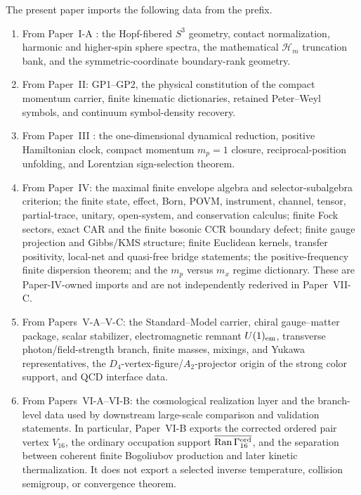 \documentclass[12pt,a4paper]{article}
\begin{document}
The present paper imports the following data from the prefix.
\begin{enumerate}[label=(I\arabic*), leftmargin=2.8em]

\item From Paper~I-A \cite{Kugelmann2026a}: the Hopf-fibered \(S^3\) geometry, contact normalization,
harmonic and higher-spin sphere spectra, the mathematical \(\mathcal H_m\) truncation bank, and the symmetric-coordinate boundary-rank geometry.

\item From Paper~II: GP1--GP2, the physical constitution of the compact momentum carrier, finite kinematic dictionaries, retained Peter--Weyl symbols, and
continuum symbol-density recovery.

\item From Paper~III \cite{Kugelmann2026c}: the one-dimensional dynamical reduction, positive
Hamiltonian clock, compact momentum \(m_p=1\) closure, reciprocal-position
unfolding, and Lorentzian sign-selection theorem.

\item From Paper~IV: the maximal finite envelope algebra and selector-subalgebra
criterion; the finite state, effect, Born, POVM, instrument, channel, tensor,
partial-trace, unitary, open-system, and conservation calculus; finite Fock
sectors, exact CAR and the finite bosonic CCR boundary defect; finite gauge
projection and Gibbs/KMS structure; finite Euclidean kernels, transfer
positivity, local-net and quasi-free bridge statements; the positive-frequency
finite dispersion theorem; and the \(m_p\) versus \(m_x\) regime dictionary.
These are Paper-IV-owned imports and are not independently rederived in
Paper~VII-C.

\item From Papers~V-A--V-C: the Standard--Model carrier, chiral gauge--matter
package, scalar stabilizer, electromagnetic remnant \(U(1)_{\rm em}\),
transverse photon/field-strength branch, finite masses, mixings, and Yukawa representatives,
the \(D_4\)-vertex-figure/\(A_2\)-projector origin of the strong color
support, and QCD interface data.

\item From Papers~VI-A--VI-B: the cosmological realization layer and the
branch-level data used by downstream large-scale comparison and validation
statements.  In particular, Paper~VI-B exports the corrected ordered pair vertex
\(V_{16}\), the ordinary occupation support
\(\overline{\operatorname{Ran}\Gamma_{16}^{\rm ord}}\), and the separation
between coherent finite Bogoliubov production and later kinetic
thermalization.  It does not export a selected inverse temperature, collision
semigroup, or convergence theorem.


\end{enumerate}
\end{document}
